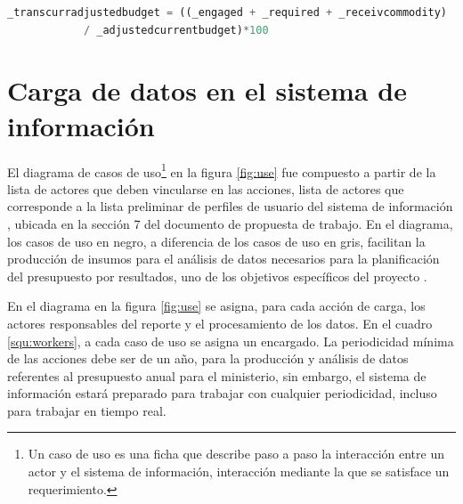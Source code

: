 \documentclass{article}
\begin{document}
\begin{multicols}{6}[]
\begin{center}
	\begin{lstlisting}[language=sql]
		_transcurradjustedbudget = ((_engaged + _required + _receivcommodity)
            / _adjustedcurrentbudget)*100
	\end{lstlisting}
	\label{sql:_transcurradjustedbudget}
\end{center}
 
\section{Carga de datos en el sistema de informaci\'on}


El diagrama de casos de uso\footnote{Un caso de uso es una ficha que describe paso a paso la interacci\'on entre un actor y el sistema de informaci\'on, interacci\'on mediante la que se satisface un requerimiento.} en la figura \ref{fig:use} fue compuesto a partir de la lista de actores que deben vincularse en las acciones, lista de actores que corresponde a la lista preliminar de perfiles de usuario del sistema de informaci\'on \cite{prop}, ubicada en la secci\'on 7 del documento de propuesta de trabajo. En el diagrama, los casos de uso en negro, a diferencia de los casos de uso en gris, facilitan la producci\'on de insumos para el an\'alisis de datos necesarios para la planificaci\'on del presupuesto por resultados, uno de los objetivos espec\'ificos del proyecto \cite{prop}.

En el diagrama en la figura \ref{fig:use} se asigna, para cada acci\'on de carga, los actores responsables del reporte y el procesamiento de los datos. En el cuadro \ref{squ:workers}, a cada caso de uso se asigna un encargado. La periodicidad m\'inima de las acciones debe ser de un a\~no, para la producci\'on y an\'alisis de datos referentes al presupuesto anual para el ministerio, sin embargo, el sistema de informaci\'on estar\'a preparado para trabajar con cualquier periodicidad, incluso para trabajar en tiempo real.


\end{multicols}
\end{document}
